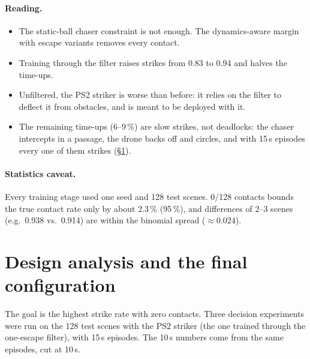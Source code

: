 \documentclass[11pt]{article}
\begin{document}
\paragraph{Reading.}
\begin{itemize}
\item The static-ball chaser constraint is not enough. The dynamics-aware margin with escape variants removes every contact.
\item Training through the filter raises strikes from 0.83 to 0.94 and halves the time-ups.
\item Unfiltered, the PS2 striker is worse than before: it relies on the filter to deflect it from obstacles, and is meant to be deployed with it.
\item The remaining time-ups (6--9\,\%) are slow strikes, not deadlocks: the chaser intercepts in a passage, the drone backs off and circles, and with 15\,s episodes every one of them strikes (\S\ref{sec:decisions}).
\end{itemize}

\paragraph{Statistics caveat.} Every training stage used one seed and 128 test scenes. 0/128 contacts bounds the true contact rate only by about 2.3\,\% (95\,\%), and differences of 2--3 scenes (e.g.\ 0.938 vs.\ 0.914) are within the binomial spread ($\approx0.024$).

\section{Design analysis and the final configuration}\label{sec:decisions}

The goal is the highest strike rate with zero contacts. Three decision experiments were run on the 128 test scenes with the PS2 striker (the one trained through the one-escape filter), with 15\,s episodes. The 10\,s numbers come from the same episodes, cut at 10\,s.
\end{document}
